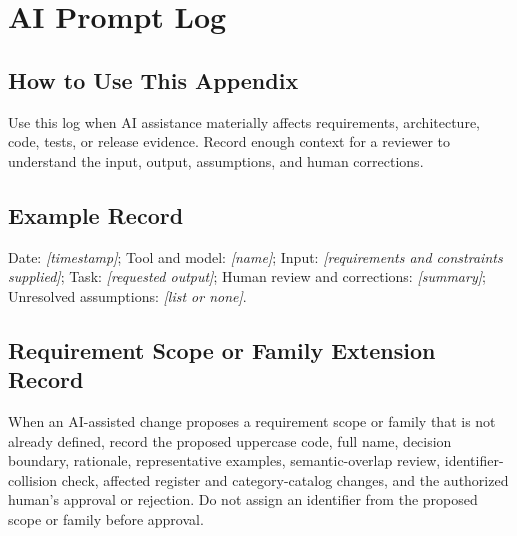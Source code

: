 \chapter{AI Prompt Log}
\section{How to Use This Appendix}
Use this log when AI assistance materially affects requirements, architecture, code, tests, or release evidence. Record enough context for a reviewer to understand the input, output, assumptions, and human corrections.
\section{Example Record}
Date: \textit{[timestamp]}; Tool and model: \textit{[name]}; Input: \textit{[requirements and constraints supplied]}; Task: \textit{[requested output]}; Human review and corrections: \textit{[summary]}; Unresolved assumptions: \textit{[list or none]}.

\section{Requirement Scope or Family Extension Record}
When an AI-assisted change proposes a requirement scope or family that is not
already defined, record the proposed uppercase code, full name, decision
boundary, rationale, representative examples, semantic-overlap review,
identifier-collision check, affected register and category-catalog changes, and
the authorized human's approval or rejection. Do not assign an identifier from
the proposed scope or family before approval.
